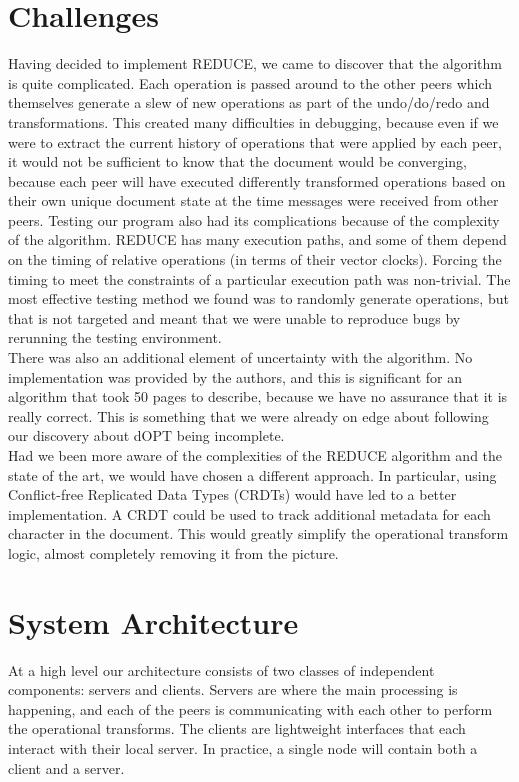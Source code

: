 \documentclass{article}
\begin{document}
\section{Challenges}
Having decided to implement REDUCE, we came to discover that the algorithm is quite complicated. Each operation is passed around to the other peers which themselves generate a slew of new operations as part of the undo/do/redo and transformations. This created many difficulties in debugging, because even if we were to extract the current history of operations that were applied by each peer, it would not be sufficient to know that the document would be converging, because each peer will have executed differently transformed operations based on their own unique document state at the time messages were received from other peers. Testing our program also had its complications because of the complexity of the algorithm. REDUCE has many execution paths, and some of them depend on the timing of relative operations (in terms of their vector clocks). Forcing the timing to meet the constraints of a particular execution path was non-trivial. The most effective testing method we found was to randomly generate operations, but that is not targeted and meant that we were unable to reproduce bugs by rerunning the testing environment.\\

There was also an additional element of uncertainty with the algorithm. No implementation was provided by the authors, and this is significant for an algorithm that took 50 pages to describe, because we have no assurance that it is really correct. This is something that we were already on edge about following our discovery about dOPT being incomplete.\\

Had we been more aware of the complexities of the REDUCE algorithm and the state of the art, we would have chosen a different approach. In particular, using Conflict-free Replicated Data Types (CRDTs) would have led to a better implementation. A CRDT could be used to track additional metadata for each character in the document. This would greatly simplify the operational transform logic, almost completely removing it from the picture.\\

\section{System Architecture}
At a high level our architecture consists of two classes of independent components: servers and clients. Servers are where the main processing is happening, and each of the peers is communicating with each other to perform the operational transforms. The clients are lightweight interfaces that each interact with their local server. In practice, a single node will contain both a client and a server.\\
\end{document}
